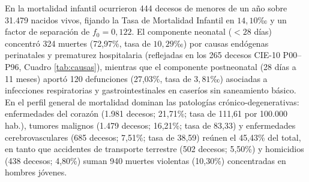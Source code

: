 \documentclass[12pt,letterpaper]{article}
\begin{document}
En la mortalidad infantil ocurrieron 444 decesos de menores de un año sobre 31.479 nacidos vivos, fijando la Tasa de Mortalidad Infantil en $14,10\text{‰}$ y un factor de separación de $f_0 = 0,122$. El componente neonatal ($< 28$ días) concentró 324 muertes (72,97\%, tasa de $10,29\text{‰}$) por causas endógenas perinatales y prematurez hospitalaria (reflejadas en los 265 decesos CIE-10 P00--P96, Cuadro \ref{tab:causas}), mientras que el componente postneonatal (28 días a 11 meses) aportó 120 defunciones (27,03\%, tasa de $3,81\text{‰}$) asociadas a infecciones respiratorias y gastrointestinales en caseríos sin saneamiento básico. En el perfil general de mortalidad dominan las patologías crónico-degenerativas: enfermedades del corazón (1.981 decesos; 21,71\%; tasa de 111,61 por 100.000 hab.), tumores malignos (1.479 decesos; 16,21\%; tasa de 83,33) y enfermedades cerebrovasculares (685 decesos; 7,51\%; tasa de 38,59) reúnen el 45,43\% del total, en tanto que accidentes de transporte terrestre (502 decesos; 5,50\%) y homicidios (438 decesos; 4,80\%) suman 940 muertes violentas (10,30\%) concentradas en hombres jóvenes.
\end{document}

